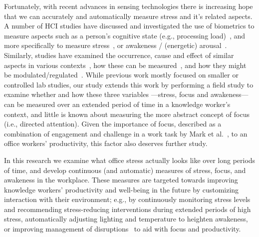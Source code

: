 Fortunately, with recent advances in sensing technologies there is increasing 
hope that we can accurately and automatically measure stress and it's related aspects. A 
number of HCI studies have discussed and investigated the use of biometrics to 
measure aspects such as a person's cognitive state 
(e.g., processing load)~\cite{beatty82,Kramer90,richter1998psychophysiological,Rowe98,Wilson2002}, 
and more specifically to measure stress~\cite{dishman2000stress,Setz2010}, 
or awakeness / (energetic) arousal~\cite{exler2016tired,mcduff2012affectaura,haag2004emotion}. Similarly,
studies have examined the occurrence, cause and effect of similar 
aspects in various contexts~\cite{mark2014bored,mark2008cost}, how these can be measured~\cite{Hernandez14}, and 
 how they might be modulated/regulated~\cite{Snyder15}. 
While previous work mostly focused on smaller or controlled lab studies, our study extends this work by performing a field study to examine whether and how these three variables ---stress, focus and awakeness--- can be measured over an extended period of time in a knowledge worker's context, 
and little is known about measuring the more 
abstract concept of focus (i.e., directed attention). 
Given the importance of focus, described as a 
combination of engagement and challenge in a work task by Mark et al.~\cite{mark2014bored}, to an office workers' productivity, this factor also 
deserves further study. 

In this research we examine what office stress actually looks like over long periods of time, and develop continuous (and automatic) 
measures of stress, focus, and awakeness in the workplace. These measures are targeted towards improving knowledge workers' productivity and 
well-being in the future by customizing interaction with their environment; e.g., by continuously monitoring stress levels and recommending stress-reducing interventions during 
extended periods of high stress, automatically adjusting lighting and temperature to heighten awakeness, or improving management 
of disruptions~\cite{iqbal2005effectiveness,zuger2017reducing} to aid with focus and productivity.

